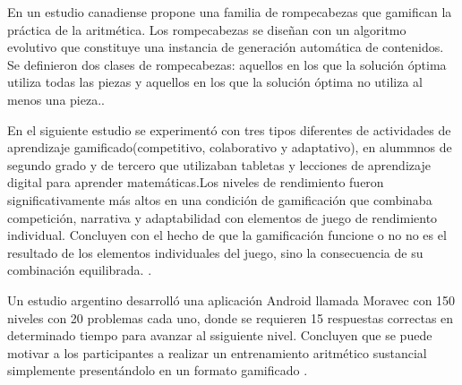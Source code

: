 \documentclass{article}
\begin{document}
En un estudio canadiense propone una familia de rompecabezas que gamifican la práctica de la aritmética. Los rompecabezas se diseñan con un algoritmo evolutivo que constituye una instancia de generación automática de contenidos. Se definieron dos clases de rompecabezas: aquellos en los que la solución óptima utiliza todas las piezas y aquellos en los que la solución óptima no utiliza al menos una pieza.\cite{foxcroft2020polyomino}.

En el siguiente estudio se experimentó con tres tipos diferentes de actividades de aprendizaje gamificado(competitivo, colaborativo y adaptativo), en alummnos de segundo grado y de tercero que utilizaban tabletas y lecciones de aprendizaje digital para aprender matemáticas.Los niveles de rendimiento fueron significativamente más altos en una condición de gamificación que combinaba competición, narrativa y adaptabilidad con elementos de juego de rendimiento individual. Concluyen con el hecho de que la gamificación funcione o no no es el resultado de los elementos individuales del juego, sino la consecuencia de su combinación equilibrada. \cite{jaguvst2018examining}.
 
Un estudio argentino desarrolló una aplicación Android llamada Moravec con 150 niveles con 20 problemas cada uno, donde se requieren 15 respuestas correctas en determinado tiempo para avanzar al ssiguiente nivel. Concluyen que se puede motivar a los participantes a realizar un entrenamiento aritmético sustancial simplemente presentándolo en un formato gamificado \cite{zimmerman2016arithmetic}.
\end{document}

